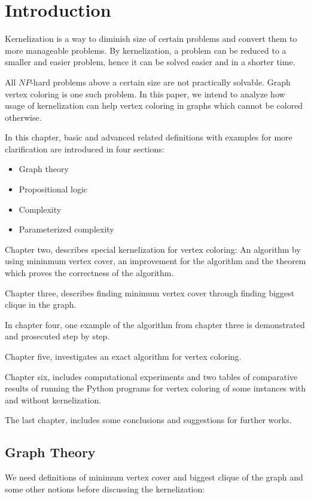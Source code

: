 \documentclass[12pt]{article}
\theoremstyle{slplain}
\begin{document}
\afterpage{\null\newpage}
\newpage
\setcounter{secnumdepth}{2}
\section{Introduction}
Kernelization is a way to diminish size of certain problems and convert them to more manageable problems. By kernelization, a problem can be reduced to a smaller and easier problem, hence it can be solved easier and in a shorter time. 

All $NP$-hard problems above a certain size are not practically solvable. Graph vertex coloring is one such problem. In this paper, we intend to analyze how usage of kernelization can help vertex coloring in graphs which cannot be colored otherwise.

In this chapter, basic and advanced related definitions with examples for more clarification are introduced in four sections:
\begin{itemize}
\item Graph theory
\item Propositional logic
\item Complexity
\item Parameterized complexity
\end{itemize}

Chapter two, describes special kernelization for vertex coloring: An algorithm by using mininmum vertex cover, an improvement for the algorithm and the theorem which proves the correctness of the algorithm.

Chapter three, describes finding minimum vertex cover through finding biggest clique in the graph.

In chapter four, one example of the algorithm from chapter three is demonstrated and prosecuted step by step.

Chapter five, investigates an exact algorithm for vertex coloring.

Chapter six, includes computational experiments and two tables of comparative results of running the Python programs for vertex coloring of some instances with and without kernelization.

The last chapter, includes some conclusions and suggestions for further works.

\newpage
\subsection{Graph Theory}
We need definitions of minimum vertex cover and biggest clique of the graph and some other notions before discussing the kernelization:
\end{document}
